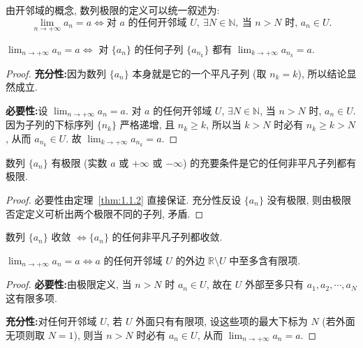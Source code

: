 由开邻域的概念, 数列极限的定义可以统一叙述为:
\[
  \lim_{n\to+\infty}a_n = a \iff \text{对 } a \text{ 的任何开邻域 } U,\ \exists N\in\mathbb{N},\ \text{当 } n>N \text{ 时, } a_n\in U.
\]

\begin{theorem}\label{thm:1.1.2}
$\lim_{n\to+\infty}a_n=a \iff$ 对 $\{a_n\}$ 的任何子列 $\{a_{n_k}\}$ 都有 $\lim_{k\to+\infty}a_{n_k}=a$.
\end{theorem}
\begin{proof}
\textbf{充分性:}\quad 因为数列 $\{a_n\}$ 本身就是它的一个平凡子列 (取 $n_k=k$), 所以结论显然成立.

\textbf{必要性:}\quad 设 $\lim_{n\to+\infty}a_n=a$. 对 $a$ 的任何开邻域 $U$, $\exists N\in\mathbb{N}$, 当 $n>N$ 时, $a_n\in U$. 因为子列的下标序列 $\{n_k\}$ 严格递增, 且 $n_k\geqslant k$, 所以当 $k>N$ 时必有 $n_k\geqslant k>N$, 从而 $a_{n_k}\in U$. 故 $\lim_{k\to+\infty}a_{n_k}=a$.
\end{proof}

\begin{theorem}\label{thm:1.1.3}
数列 $\{a_{n}\}$ 有极限 (实数 $a$ 或 $+\infty$ 或 $-\infty$) 的充要条件是它的任何非平凡子列都有极限.
\end{theorem}
\begin{proof}
必要性由定理~\ref{thm:1.1.2} 直接保证. 充分性反设 $\{a_n\}$ 没有极限, 则由极限否定定义可析出两个极限不同的子列, 矛盾.
\end{proof}

\begin{theorem}\label{thm:1.1.4}
数列 $\{a_{n}\}$ 收敛 $\iff \{a_{n}\}$ 的任何非平凡子列都收敛.
\end{theorem}

\begin{theorem}\label{thm:1.1.5}
$\lim_{n \to +\infty} a_n = a \iff a$ 的任何开邻域 $U$ 的外边 $\mathbb{R} \setminus U$ 中至多含有限项.
\end{theorem}
\begin{proof}
\textbf{必要性:}\quad 由极限定义, 当 $n>N$ 时 $a_n\in U$, 故在 $U$ 外部至多只有 $a_1, a_2, \cdots, a_N$ 这有限多项.

\textbf{充分性:}\quad 对任何开邻域 $U$, 若 $U$ 外面只有有限项, 设这些项的最大下标为 $N$ (若外面无项则取 $N=1$), 则当 $n>N$ 时必有 $a_n\in U$, 从而 $\lim_{n\to+\infty}a_n=a$.
\end{proof}

